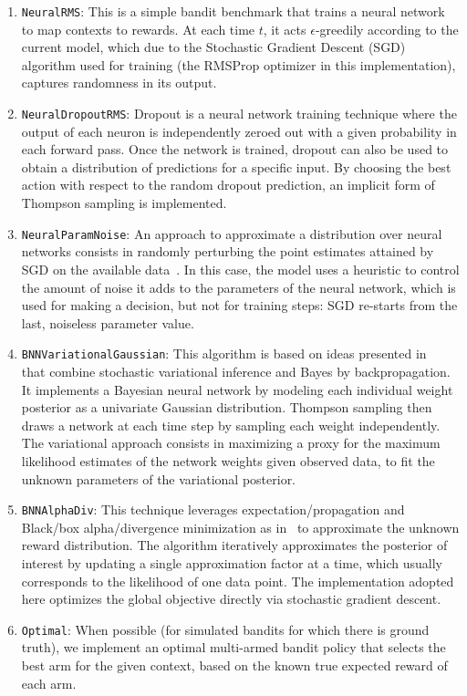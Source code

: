 \begin{enumerate}
	\item \texttt{NeuralRMS}: This is a simple bandit benchmark that trains a neural network to map contexts to rewards. At each time $t$, it acts $\epsilon$-greedily according to the current model, which due to the Stochastic Gradient Descent (SGD) algorithm used for training (\ie the RMSProp optimizer in this implementation), captures randomness in its output.
	
	\item \texttt{NeuralDropoutRMS}: Dropout is a neural network training technique where the output of each neuron is independently zeroed out with a given probability in each forward pass. Once the network is trained, dropout can also be used to obtain a distribution of predictions for a specific input. By choosing the best action with respect to the random dropout prediction, an implicit form of Thompson sampling is implemented.
	
	\item \texttt{NeuralParamNoise}: An approach to approximate a distribution over neural networks consists in randomly perturbing the point estimates attained by SGD on the available data~\cite{ip-Plappert2018}. In this case, the model uses a heuristic to control the amount of \iid noise it adds to the parameters of the neural network, which is used for making a decision, but not for training steps: SGD re-starts from the last, noiseless parameter value.
	
	\item \texttt{BNNVariationalGaussian}: This algorithm is based on ideas presented in~\citep{ip-Blundell2015} that combine stochastic variational inference and Bayes by backpropagation. It implements a Bayesian neural network by modeling each individual weight posterior as a univariate Gaussian distribution. Thompson sampling then draws a network at each time step by sampling each weight independently. The variational approach consists in maximizing a proxy for the maximum likelihood estimates of the network weights given observed data, to fit the unknown parameters of the variational posterior.
	
	\item \texttt{BNNAlphaDiv}: This technique leverages expecta\-tion\-/pro\-pagation and Black\-/box alpha\-/divergence minimization as in~\cite{ip-Hernandez-Lobato2016} to approximate the unknown reward distribution. The algorithm iteratively approximates the posterior of interest by updating a single approximation factor at a time, which usually corresponds to the likelihood of one data point. The implementation adopted here optimizes the global objective directly via stochastic gradient descent.
	
	\item \texttt{Optimal}: When possible (\ie for simulated bandits for which there is ground truth), we implement an optimal multi-armed bandit policy that selects the best arm for the given context, based on the known true expected reward of each arm.
\end{enumerate}

